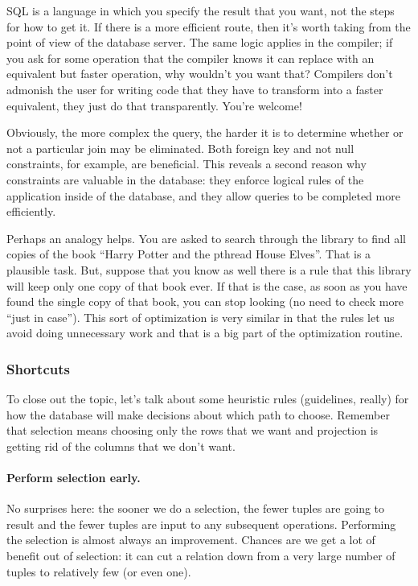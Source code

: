 SQL is a language in which you specify the result that you want, not the steps for how to get it. If there is a more efficient route, then it's worth taking from the point of view of the database server. The same logic applies in the compiler; if you ask for some operation that the compiler knows it can replace with an equivalent but faster operation, why wouldn't you want that? Compilers don't admonish the user for writing code that they have to transform into a faster equivalent, they just do that transparently. You're welcome!

Obviously, the more complex the query, the harder it is to determine whether or not a particular join may be eliminated. Both foreign key and not null constraints, for example, are beneficial. This reveals a second reason why constraints are valuable in the database: they enforce logical rules of the application inside of the database, and they allow queries to be completed more efficiently.

Perhaps an analogy helps. You are asked to search through the library to find all copies of the book ``Harry Potter and the pthread House Elves''. That is a plausible task. But, suppose that you know as well there is a rule that this library will keep only one copy of that book ever. If that is the case, as soon as you have found the single copy of that book, you can stop looking (no need to check more ``just in case''). This sort of optimization is very similar in that the rules let us avoid doing unnecessary work and that is a big part of the optimization routine.

\subsubsection*{Shortcuts}

To close out the topic, let's talk about some heuristic rules (guidelines, really) for how the database will make decisions about which path to choose. Remember that selection means choosing only the rows that we want and projection is getting rid of the columns that we don't want. 

\paragraph{Perform selection early.} No surprises here: the sooner we do a selection, the fewer tuples are going to result and the fewer tuples are input to any subsequent operations. Performing the selection is almost always an improvement. Chances are we get a lot of benefit out of selection: it can cut a relation down from a very large number of tuples to relatively few (or even one). 

